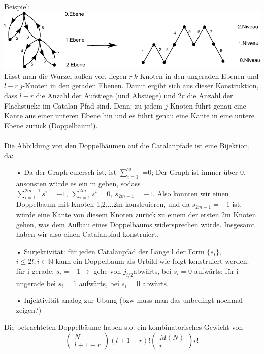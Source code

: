 \documentclass[a4paper, 11pt]{scrreprt}
\newcommand{\NN}{\mathbb{N}}
\begin{document}
Beispiel: \\
\includegraphics{Catalan-Pfad}
Lässt man die Wurzel außen vor, liegen \(r\ k\)-Knoten in den ungeraden Ebenen und \(l-r\ j\)-Knoten in den geraden Ebenen. Damit ergibt sich aus dieser Konstruktion, dass \(l-r\) die Anzahl der Aufstiege (und Abstiege) und \(2r\) die Anzahl der Flachstücke im Catalan-Pfad sind.  Denn: zu jedem \(j\)-Knoten führt genau eine Kante aus einer unteren Ebene hin und es führt genau eine Kante in eine untere Ebene zurück (Doppelbaum!). \\
\\ Die Abbildung von den Doppelbäumen auf die Catalanpfade ist eine Bijektion, da:
\begin{itemize}
 \item[•]Da der Graph eulersch ist, ist $ \sum_{i=1}^{2l} $ =0; Der Graph ist immer über 0, ansonsten würde es ein m geben, sodass $ \sum_{i=1}^{2m-1}s^{i}=-1, ~\sum_{i=1}^{2m}s^{i}=0, ~ s_{2m-1}=-1  $. Also könnten wir einen Doppelbaum mit Knoten {1,2,...2m} konstruieren, und da $ s_{2m-1}=-1  $ ist, würde eine Kante von diesem Knoten zurück zu einem der ersten 2m Knoten gehen, was dem Aufbau eines Doppelbaums widersprechen würde. Insgesamt haben wir also einen Catalanpfad konstruiert. 
 \item[•] Surjektivität:  für jeden Catalanpfad der Länge l der Form $\lbrace s_{i} \rbrace$, $ i \leq 2l, i \in \NN $ kann ein Doppelbaum als Urbild wie folgt konstruiert werden: für i gerade: $s_{i}=-1 \rightarrow $ gehe von $j_{i/2}$abwärts, bei $s_{i}=0  $ aufwärts; für i ungerade bei $s_{i}=1 $ aufwärts, bei $s_{i}=0 $ abwärts. 
\item[•] Injektivität analog zur Übung (bzw muss man das unbedingt nochmal zeigen?)\\
\end{itemize}
Die betrachteten Doppelbäume haben s.o. ein kombinatorisches Gewicht von 
	\begin{equation}
		\begin{pmatrix} N\\ l+1-r\end{pmatrix} (l+1-r)! \begin{pmatrix} M(N)\\r\end{pmatrix} r!
	\end{equation}
\end{document}
